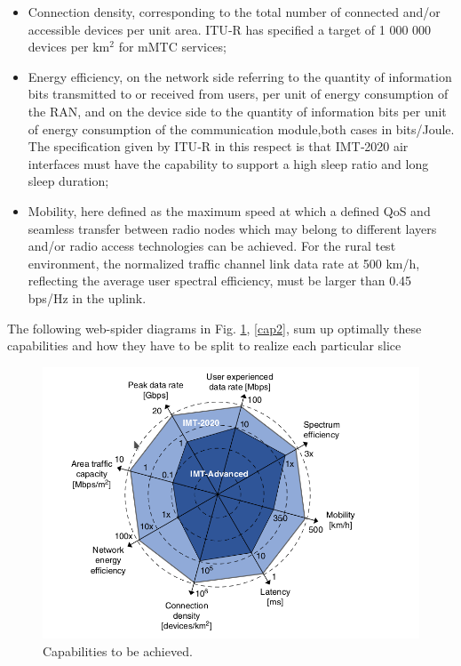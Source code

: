 \documentclass{report}
\begin{document}
\begin{itemize}
\item Connection density, corresponding to the total number of connected and/or accessible devices
per unit area. ITU‐R has specified a target of 1 000 000 devices per km$^2$ for mMTC services;
\end{itemize}
\begin{itemize}
\item Energy efficiency, on the network side referring to the quantity of information bits transmitted to or received from users, per unit of energy consumption of the RAN, and on the device side to the
quantity of information bits per unit of energy consumption of the communication module,both cases in bits/Joule. The specification given by ITU‐R in this respect is that IMT‐2020 air interfaces must have the capability to support a high sleep ratio and long sleep duration;
\end{itemize}
\begin{itemize}
\item Mobility, here defined as the maximum speed at which a defined QoS and
seamless transfer between radio nodes which may belong to different layers and/or radio access
technologies can be achieved. For the rural test environment, the normalized traffic channel link
data rate at 500 km/h, reflecting the average user spectral efficiency, must be larger than 0.45 bps/Hz
in the uplink.
\end{itemize}
The following web-spider diagrams in Fig. \ref{cap1}, \ref{cap2}, sum up optimally these capabilities and how they have to be split to realize each particular slice
\begin{figure}[h]
\centering
\includegraphics[scale=0.4]{pics/capabilities1.png}
\caption{Capabilities to be achieved. \cite{al20185g}} 
\label{cap1}
\end{figure}
\end{document}
